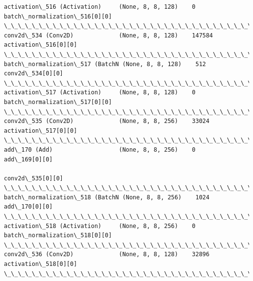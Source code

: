 \documentclass[11pt]{article}
\begin{document}
\begin{Verbatim}[commandchars=\\\{\}]
activation\_516 (Activation)     (None, 8, 8, 128)    0           batch\_normalization\_516[0][0]    
\_\_\_\_\_\_\_\_\_\_\_\_\_\_\_\_\_\_\_\_\_\_\_\_\_\_\_\_\_\_\_\_\_\_\_\_\_\_\_\_\_\_\_\_\_\_\_\_\_\_\_\_\_\_\_\_\_\_\_\_\_\_\_\_\_\_\_\_\_\_\_\_\_\_\_\_\_\_\_\_\_\_\_\_\_\_\_\_\_\_\_\_\_\_\_\_\_\_
conv2d\_534 (Conv2D)             (None, 8, 8, 128)    147584      activation\_516[0][0]             
\_\_\_\_\_\_\_\_\_\_\_\_\_\_\_\_\_\_\_\_\_\_\_\_\_\_\_\_\_\_\_\_\_\_\_\_\_\_\_\_\_\_\_\_\_\_\_\_\_\_\_\_\_\_\_\_\_\_\_\_\_\_\_\_\_\_\_\_\_\_\_\_\_\_\_\_\_\_\_\_\_\_\_\_\_\_\_\_\_\_\_\_\_\_\_\_\_\_
batch\_normalization\_517 (BatchN (None, 8, 8, 128)    512         conv2d\_534[0][0]                 
\_\_\_\_\_\_\_\_\_\_\_\_\_\_\_\_\_\_\_\_\_\_\_\_\_\_\_\_\_\_\_\_\_\_\_\_\_\_\_\_\_\_\_\_\_\_\_\_\_\_\_\_\_\_\_\_\_\_\_\_\_\_\_\_\_\_\_\_\_\_\_\_\_\_\_\_\_\_\_\_\_\_\_\_\_\_\_\_\_\_\_\_\_\_\_\_\_\_
activation\_517 (Activation)     (None, 8, 8, 128)    0           batch\_normalization\_517[0][0]    
\_\_\_\_\_\_\_\_\_\_\_\_\_\_\_\_\_\_\_\_\_\_\_\_\_\_\_\_\_\_\_\_\_\_\_\_\_\_\_\_\_\_\_\_\_\_\_\_\_\_\_\_\_\_\_\_\_\_\_\_\_\_\_\_\_\_\_\_\_\_\_\_\_\_\_\_\_\_\_\_\_\_\_\_\_\_\_\_\_\_\_\_\_\_\_\_\_\_
conv2d\_535 (Conv2D)             (None, 8, 8, 256)    33024       activation\_517[0][0]             
\_\_\_\_\_\_\_\_\_\_\_\_\_\_\_\_\_\_\_\_\_\_\_\_\_\_\_\_\_\_\_\_\_\_\_\_\_\_\_\_\_\_\_\_\_\_\_\_\_\_\_\_\_\_\_\_\_\_\_\_\_\_\_\_\_\_\_\_\_\_\_\_\_\_\_\_\_\_\_\_\_\_\_\_\_\_\_\_\_\_\_\_\_\_\_\_\_\_
add\_170 (Add)                   (None, 8, 8, 256)    0           add\_169[0][0]                    
                                                                 conv2d\_535[0][0]                 
\_\_\_\_\_\_\_\_\_\_\_\_\_\_\_\_\_\_\_\_\_\_\_\_\_\_\_\_\_\_\_\_\_\_\_\_\_\_\_\_\_\_\_\_\_\_\_\_\_\_\_\_\_\_\_\_\_\_\_\_\_\_\_\_\_\_\_\_\_\_\_\_\_\_\_\_\_\_\_\_\_\_\_\_\_\_\_\_\_\_\_\_\_\_\_\_\_\_
batch\_normalization\_518 (BatchN (None, 8, 8, 256)    1024        add\_170[0][0]                    
\_\_\_\_\_\_\_\_\_\_\_\_\_\_\_\_\_\_\_\_\_\_\_\_\_\_\_\_\_\_\_\_\_\_\_\_\_\_\_\_\_\_\_\_\_\_\_\_\_\_\_\_\_\_\_\_\_\_\_\_\_\_\_\_\_\_\_\_\_\_\_\_\_\_\_\_\_\_\_\_\_\_\_\_\_\_\_\_\_\_\_\_\_\_\_\_\_\_
activation\_518 (Activation)     (None, 8, 8, 256)    0           batch\_normalization\_518[0][0]    
\_\_\_\_\_\_\_\_\_\_\_\_\_\_\_\_\_\_\_\_\_\_\_\_\_\_\_\_\_\_\_\_\_\_\_\_\_\_\_\_\_\_\_\_\_\_\_\_\_\_\_\_\_\_\_\_\_\_\_\_\_\_\_\_\_\_\_\_\_\_\_\_\_\_\_\_\_\_\_\_\_\_\_\_\_\_\_\_\_\_\_\_\_\_\_\_\_\_
conv2d\_536 (Conv2D)             (None, 8, 8, 128)    32896       activation\_518[0][0]             
\_\_\_\_\_\_\_\_\_\_\_\_\_\_\_\_\_\_\_\_\_\_\_\_\_\_\_\_\_\_\_\_\_\_\_\_\_\_\_\_\_\_\_\_\_\_\_\_\_\_\_\_\_\_\_\_\_\_\_\_\_\_\_\_\_\_\_\_\_\_\_\_\_\_\_\_\_\_\_\_\_\_\_\_\_\_\_\_\_\_\_\_\_\_\_\_\_\_

\end{Verbatim}
\end{document}
